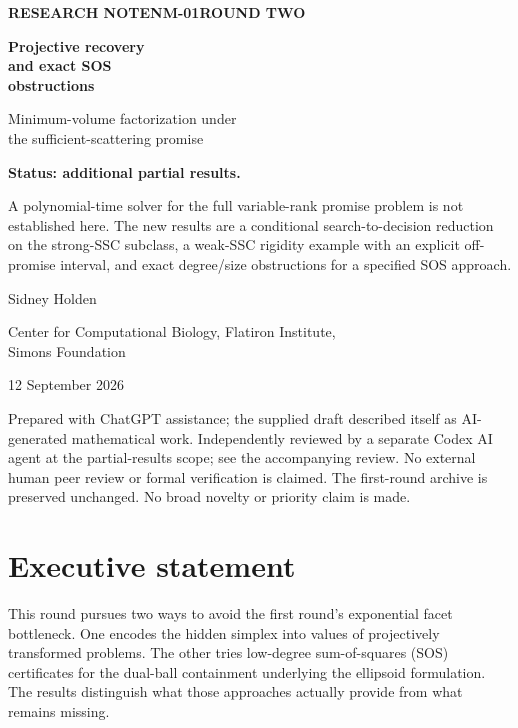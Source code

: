 \documentclass[11pt]{article}
\theoremstyle{definition}\newtheorem{definition}[theorem]{Definition}
\begin{document}
\begin{titlepage}
\vspace*{0.55in}
{\small\bfseries\color{ink}RESEARCH NOTE\quad NM-01\quad ROUND TWO}\par
\vspace{0.40in}
{\Huge\bfseries\color{ink}Projective recovery\\[6pt] and exact SOS\\[6pt] obstructions}\par
\vspace{0.30in}
{\Large Minimum-volume factorization under\\the sufficient-scattering promise}\par
\vspace{0.40in}
\colorbox{pale}{\parbox{0.94\textwidth}{\vspace{9pt}\textbf{Status: additional partial results.}\par
A polynomial-time solver for the full variable-rank promise problem is not established here. The new results are a conditional search-to-decision reduction on the strong-SSC subclass, a weak-SSC rigidity example with an explicit off-promise interval, and exact degree/size obstructions for a specified SOS approach.\vspace{9pt}}}
\vfill
{\large Sidney Holden}\par
{\small Center for Computational Biology, Flatiron Institute,\\Simons Foundation}\par
12 September 2026\par
\vspace{0.18in}
{\small\color{muted}Prepared with ChatGPT assistance; the supplied draft described itself as AI-generated mathematical work. Independently reviewed by a separate Codex AI agent at the partial-results scope; see the accompanying review. No external human peer review or formal verification is claimed. The first-round archive is preserved unchanged. No broad novelty or priority claim is made.}\par
\end{titlepage}

\section*{Executive statement}
This round pursues two ways to avoid the first round's exponential facet bottleneck. One encodes the hidden simplex into values of projectively transformed problems. The other tries low-degree sum-of-squares (SOS) certificates for the dual-ball containment underlying the ellipsoid formulation. The results distinguish what those approaches actually provide from what remains missing.
\end{document}
